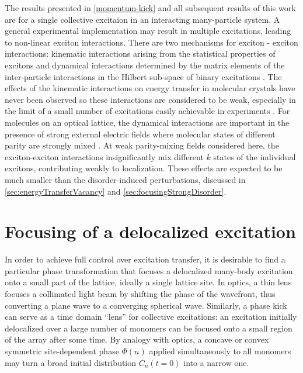 The results presented in \autoref{momentum-kick}  and all subsequent results of this work are for a single 
collective excitaion in an interacting many-particle system. A general experimental implementation may result in 
multiple excitations, leading to non-linear exciton interactions. There are two mechanisms for exciton - exciton 
interactions: kinematic interactions arising from the statistical properties of excitons and dynamical 
interactions determined by the matrix elements of the inter-particle interactions in the Hilbert sub-space of binary 
excitations \cite{agranovich, marina-bookchapter}. The effects of the kinematic interactions on energy transfer
 in molecular crystals have never been observed so these interactions are considered to be weak, especially in the
 limit of a small number of excitations easily achievable in experiments \cite{kinematic-biexciton-agranovich}. For molecules 
on an optical lattice, the dynamical interactions are important in the presence of strong external electric fields where
 molecular states of different parity are strongly mixed \cite{biexcitons, felipe}.
At weak parity-mixing fields considered here, the exciton-exciton interactions insignificantly mix different $k$ states
 of the individual excitons, contributing weakly  to localization. These effects are expected to be much smaller than
 the disorder-induced perturbations,  discussed in \autoref{sec:energyTransferVacancy}  and \autoref{sec:focusingStrongDisorder}.










\section{Focusing of a delocalized excitation}
\label{sec:focusing}

In order to achieve full control over excitation transfer, it is desirable to find a particular phase transformation
that focuses a delocalized many-body excitation onto a small part of the lattice, ideally a single lattice site.
In optics, a thin lens focuses a collimated light beam by shifting
the phase of the wavefront, thus converting a plane wave to a
converging spherical wave. Similarly, a phase kick can serve as a
time domain ``lens'' for collective excitations: an excitation initially
delocalized over a large number of monomers can be focused onto a
small region of the array after some time. By analogy with optics, a concave or convex
symmetric site-dependent phase $\Phi(n)$ applied simultaneously to
all monomers may turn a broad initial distribution $C_n(t=0)$ into
a narrow one.

